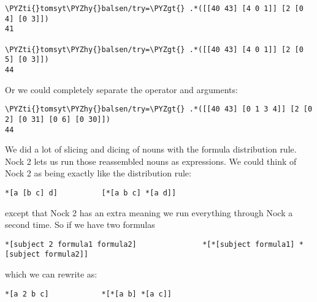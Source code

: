 \begin{framed_shaded}
\begin{Verbatim}[fontsize=\relsize{-2.5},fontseries=b,commandchars=\\\{\}]
\PYZti{}tomsyt\PYZhy{}balsen/try=\PYZgt{} .*([[40 43] [4 0 1]] [2 [0 4] [0 3]])
41

\PYZti{}tomsyt\PYZhy{}balsen/try=\PYZgt{} .*([[40 43] [4 0 1]] [2 [0 5] [0 3]])
44
\end{Verbatim}
\end{framed_shaded}
Or we could completely separate the operator and arguments:

\begin{framed_shaded}
\begin{Verbatim}[fontsize=\relsize{-2.5},fontseries=b,commandchars=\\\{\}]
\PYZti{}tomsyt\PYZhy{}balsen/try=\PYZgt{} .*([[40 43] [0 1 3 4]] [2 [0 2] [0 31] [0 6] [0 30]])
44
\end{Verbatim}
\end{framed_shaded}
We did a lot of slicing and dicing of nouns with the formula distribution rule.
Nock 2 lets us run those reassembled nouns as expressions. We could think of
Nock 2 as being exactly like the distribution rule:

\begin{framed_shaded}
\begin{Verbatim}[fontsize=\relsize{-2.5},fontseries=b,commandchars=\\\{\}]
*[a [b c] d]          [*[a b c] *[a d]]  
\end{Verbatim}
\end{framed_shaded}
except that Nock 2 has an extra \kode{*} meaning we run everything through Nock a
second time. So if we have two formulas 

\begin{framed_shaded}
\begin{Verbatim}[fontsize=\relsize{-2.5},fontseries=b,commandchars=\\\{\}]
*[subject 2 formula1 formula2]               *[*[subject formula1] *[subject formula2]]  
\end{Verbatim}
\end{framed_shaded}
which we can rewrite as:

\begin{framed_shaded}
\begin{Verbatim}[fontsize=\relsize{-2.5},fontseries=b,commandchars=\\\{\}]
*[a 2 b c]            *[*[a b] *[a c]] 
\end{Verbatim}
\end{framed_shaded}

